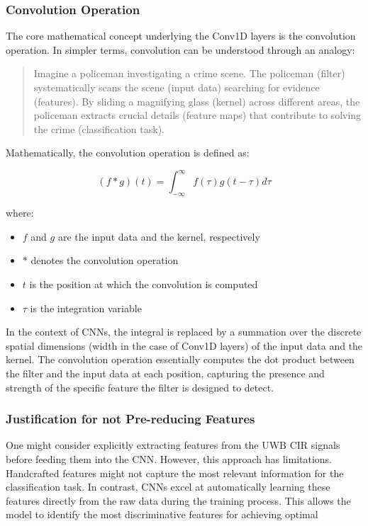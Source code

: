 \documentclass[
	article, %
	11pt, %
	draft, %
]{CSUniSchoolLabReport}
\begin{document}
\subsubsection{Convolution Operation}

The core mathematical concept underlying the Conv1D layers is the convolution operation. In simpler terms, convolution can be understood through an analogy:

\begin{quote}
 Imagine a policeman investigating a crime scene. The policeman (filter) systematically scans the scene (input data) searching for evidence (features). By sliding a magnifying glass (kernel) across different areas, the policeman extracts crucial details (feature maps) that contribute to solving the crime (classification task).
\end{quote}

Mathematically, the convolution operation is defined as:

\begin{equation}
(f * g)(t) = \int_{-\infty}^{\infty} f(\tau)g(t - \tau) d\tau
\end{equation}

where:

\begin{itemize}
  \item $f$ and $g$ are the input data and the kernel, respectively
  \item $*$ denotes the convolution operation
  \item $t$ is the position at which the convolution is computed
  \item $\tau$ is the integration variable
\end{itemize}

In the context of CNNs, the integral is replaced by a summation over the discrete spatial dimensions (width in the case of Conv1D layers) of the input data and the kernel. The convolution operation essentially computes the dot product between the filter and the input data at each position, capturing the presence and strength of the specific feature the filter is designed to detect.

\subsubsection{Justification for not Pre-reducing Features}

One might consider explicitly extracting features from the UWB CIR signals before feeding them into the CNN. However, this approach has limitations. Handcrafted features might not capture the most relevant information for the classification task. In contrast, CNNs excel at automatically learning these features directly from the raw data during the training process. This allows the model to identify the most discriminative features for achieving optimal
\end{document}
